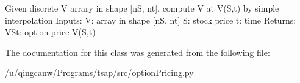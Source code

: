 \begin{DoxyVerb}Given discrete V arrary in shape [nS, nt], compute V at V(S,t) by 
simple interpolation
Inputs:
V: array in shape [nS, nt]
S: stock price
t: time
Returns:
VSt: option price V(S,t)
\end{DoxyVerb}
 

The documentation for this class was generated from the following file\+:\begin{DoxyCompactItemize}
\item 
/u/qingcanw/\+Programs/tsap/src/option\+Pricing.\+py\end{DoxyCompactItemize}
